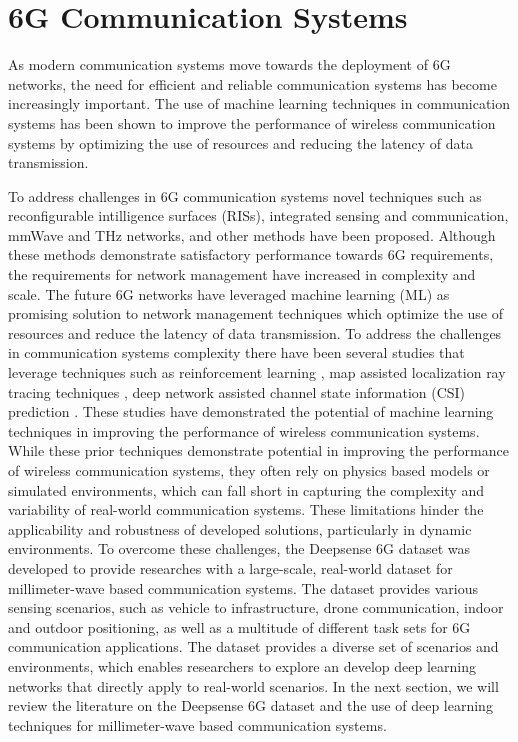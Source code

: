 \section{6G Communication Systems}
As modern communication systems move towards the deployment of 6G networks, the need for efficient and reliable communication systems has become increasingly important. The use of machine learning techniques in communication systems has been shown to improve the performance of wireless communication systems by optimizing the use of resources and reducing the latency of data transmission.

To address challenges in 6G communication systems novel techniques such as reconfigurable intilligence surfaces (RISs), integrated sensing and communication, mmWave and THz networks, and other methods have been proposed. \cite{zhou2023survey} Although these methods demonstrate satisfactory performance towards 6G requirements, the requirements for network management have increased in complexity and scale. The future 6G networks have leveraged machine learning (ML) as promising solution to network management techniques which optimize the use of resources and reduce the latency of data transmission. \cite{zhou2024large} To address the challenges in communication systems complexity there have been several studies that leverage techniques such as reinforcement learning \cite{zhou2021ran}, map assisted localization ray tracing techniques \cite{vuckovic2021map}, deep network assisted channel state information (CSI) prediction \cite{vuckovic2024csi}. These studies have demonstrated the potential of machine learning techniques in improving the performance of wireless communication systems. While these prior techniques demonstrate potential in improving the performance of wireless communication systems, they often rely on physics based models or simulated environments, which can fall short in capturing the complexity and variability of real-world communication systems. These limitations hinder the applicability and robustness of developed solutions, particularly in dynamic environments. To overcome these challenges, the Deepsense 6G dataset was developed to provide researches with a large-scale, real-world dataset for millimeter-wave based communication systems.  The dataset provides various sensing scenarios, such as vehicle to infrastructure, drone communication, indoor and outdoor positioning, as well as a multitude of different task sets for 6G communication applications.\cite{alkhateeb2023deepsense} The dataset provides a diverse set of scenarios and environments, which enables researchers to explore an develop deep learning networks that directly apply to real-world scenarios. In the next section, we will review the literature on the Deepsense 6G dataset and the use of deep learning techniques for millimeter-wave based communication systems.

